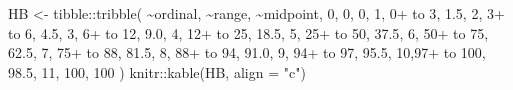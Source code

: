 \documentclass[
  letterpaper,
]{book}
\newenvironment{Shaded}{\begin{snugshade}}{\end{snugshade}}
\newcommand{\AttributeTok}[1]{\textcolor[rgb]{0.40,0.45,0.13}{#1}}
\newcommand{\DecValTok}[1]{\textcolor[rgb]{0.68,0.00,0.00}{#1}}
\newcommand{\FloatTok}[1]{\textcolor[rgb]{0.68,0.00,0.00}{#1}}
\newcommand{\FunctionTok}[1]{\textcolor[rgb]{0.28,0.35,0.67}{#1}}
\newcommand{\NormalTok}[1]{\textcolor[rgb]{0.00,0.23,0.31}{#1}}
\newcommand{\OtherTok}[1]{\textcolor[rgb]{0.00,0.23,0.31}{#1}}
\newcommand{\SpecialCharTok}[1]{\textcolor[rgb]{0.37,0.37,0.37}{#1}}
\newcommand{\StringTok}[1]{\textcolor[rgb]{0.13,0.47,0.30}{#1}}
\begin{document}
\begin{Shaded}
\begin{Highlighting}[]
\NormalTok{HB }\OtherTok{\textless{}{-}}\NormalTok{ tibble}\SpecialCharTok{::}\FunctionTok{tribble}\NormalTok{(}
  \SpecialCharTok{\textasciitilde{}}\NormalTok{ordinal, }\SpecialCharTok{\textasciitilde{}}\StringTok{\textquotesingle{}range\textquotesingle{}}\NormalTok{, }\SpecialCharTok{\textasciitilde{}}\NormalTok{midpoint,}
  \DecValTok{0}\NormalTok{,          }\StringTok{\textquotesingle{}0\textquotesingle{}}\NormalTok{,    }\DecValTok{0}\NormalTok{,   }
  \DecValTok{1}\NormalTok{,    }\StringTok{\textquotesingle{}0+ to 3\textquotesingle{}}\NormalTok{,  }\FloatTok{1.5}\NormalTok{,   }
  \DecValTok{2}\NormalTok{,    }\StringTok{\textquotesingle{}3+ to 6\textquotesingle{}}\NormalTok{,  }\FloatTok{4.5}\NormalTok{,   }
  \DecValTok{3}\NormalTok{,   }\StringTok{\textquotesingle{}6+ to 12\textquotesingle{}}\NormalTok{,  }\FloatTok{9.0}\NormalTok{,  }
  \DecValTok{4}\NormalTok{,  }\StringTok{\textquotesingle{}12+ to 25\textquotesingle{}}\NormalTok{, }\FloatTok{18.5}\NormalTok{, }
  \DecValTok{5}\NormalTok{,  }\StringTok{\textquotesingle{}25+ to 50\textquotesingle{}}\NormalTok{, }\FloatTok{37.5}\NormalTok{, }
  \DecValTok{6}\NormalTok{,  }\StringTok{\textquotesingle{}50+ to 75\textquotesingle{}}\NormalTok{, }\FloatTok{62.5}\NormalTok{, }
  \DecValTok{7}\NormalTok{,  }\StringTok{\textquotesingle{}75+ to 88\textquotesingle{}}\NormalTok{, }\FloatTok{81.5}\NormalTok{, }
  \DecValTok{8}\NormalTok{,  }\StringTok{\textquotesingle{}88+ to 94\textquotesingle{}}\NormalTok{, }\FloatTok{91.0}\NormalTok{, }
  \DecValTok{9}\NormalTok{,  }\StringTok{\textquotesingle{}94+ to 97\textquotesingle{}}\NormalTok{, }\FloatTok{95.5}\NormalTok{, }
  \DecValTok{10}\NormalTok{,}\StringTok{\textquotesingle{}97+ to 100\textquotesingle{}}\NormalTok{, }\FloatTok{98.5}\NormalTok{,  }
  \DecValTok{11}\NormalTok{,      }\StringTok{\textquotesingle{}100\textquotesingle{}}\NormalTok{,   }\DecValTok{100} 
\NormalTok{  )}
\NormalTok{knitr}\SpecialCharTok{::}\FunctionTok{kable}\NormalTok{(HB, }\AttributeTok{align =} \StringTok{"c"}\NormalTok{)}
\end{Highlighting}
\end{Shaded}
\end{document}
